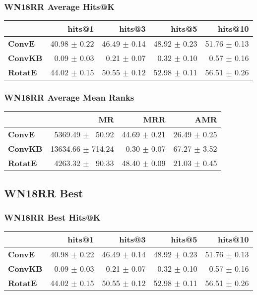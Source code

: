 \documentclass{article}
\begin{document}
\subsubsection{WN18RR Average Hits@K}
    \begin{center}
    \begin{tabular}{lrrrr}
\toprule
{} &        hits@1 &        hits@3 &        hits@5 &       hits@10 \\
\midrule
\textbf{ConvE } &  40.98 $\pm$ 0.22 &  46.49 $\pm$ 0.14 &  48.92 $\pm$ 0.23 &  51.76 $\pm$ 0.13 \\
\textbf{ConvKB} &  $\phantom{5}$0.09 $\pm$ 0.03 &  $\phantom{5}$0.21 $\pm$ 0.07 &  $\phantom{5}$0.32 $\pm$ 0.10 &  $\phantom{5}$0.57 $\pm$ 0.16 \\
\textbf{RotatE} &  44.02 $\pm$ 0.15 &  50.55 $\pm$ 0.12 &  52.98 $\pm$ 0.11 &  56.51 $\pm$ 0.26 \\
\bottomrule
\end{tabular}

    \end{center}
\subsubsection{WN18RR Average Mean Ranks}
    \begin{center}
    \begin{tabular}{lrrr}
\toprule
{} &                 MR &           MRR &           AMR \\
\midrule
\textbf{ConvE } &  $\phantom{5}$5369.49 $\pm$ $\phantom{5}$50.92 &  44.69 $\pm$ 0.21 &  26.49 $\pm$ 0.25 \\
\textbf{ConvKB} &  13634.66 $\pm$ 714.24 &  $\phantom{5}$0.30 $\pm$ 0.07 &  67.27 $\pm$ 3.52 \\
\textbf{RotatE} &  $\phantom{5}$4263.32 $\pm$ $\phantom{5}$90.33 &  48.40 $\pm$ 0.09 &  21.03 $\pm$ 0.45 \\
\bottomrule
\end{tabular}

    \end{center}
\subsection{WN18RR Best}
\subsubsection{WN18RR Best Hits@K}
    \begin{center}
    \begin{tabular}{lrrrr}
\toprule
{} &        hits@1 &        hits@3 &        hits@5 &       hits@10 \\
\midrule
\textbf{ConvE } &  40.98 $\pm$ 0.22 &  46.49 $\pm$ 0.14 &  48.92 $\pm$ 0.23 &  51.76 $\pm$ 0.13 \\
\textbf{ConvKB} &  $\phantom{5}$0.09 $\pm$ 0.03 &  $\phantom{5}$0.21 $\pm$ 0.07 &  $\phantom{5}$0.32 $\pm$ 0.10 &  $\phantom{5}$0.57 $\pm$ 0.16 \\
\textbf{RotatE} &  44.02 $\pm$ 0.15 &  50.55 $\pm$ 0.12 &  52.98 $\pm$ 0.11 &  56.51 $\pm$ 0.26 \\
\bottomrule
\end{tabular}

    \end{center}
\end{document}
